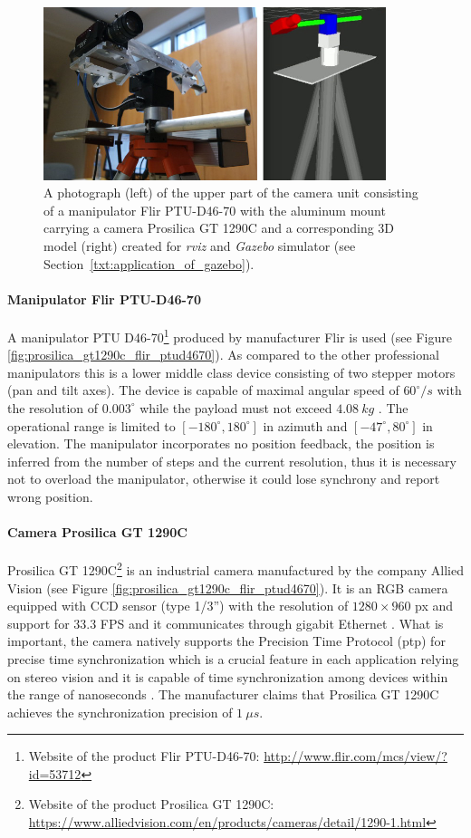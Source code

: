 \begin{figure}[tbh]
	\centering
	\includegraphics[width=10cm]{fig/camera_unit_photo_model.jpg}
	\caption{A photograph (left) of the upper part of the camera unit consisting of a manipulator Flir PTU-D46-70 with the aluminum mount carrying a camera Prosilica GT 1290C and a corresponding 3D model (right) created for \textit{rviz} and \textit{Gazebo} simulator (see Section~\ref{txt:application_of_gazebo}).}
	\label{fig:camera_unit_photo_model}
\end{figure}

\paragraph{Manipulator Flir PTU-D46-70} A manipulator PTU D46-70\footnote{Website of the product Flir PTU-D46-70: \url{http://www.flir.com/mcs/view/?id=53712}} produced by manufacturer Flir is used (see Figure \ref{fig:prosilica_gt1290c_flir_ptud4670}). As compared to the other professional manipulators this is a lower middle class device consisting of two stepper motors (pan and tilt axes). The device is capable of maximal angular speed of $60^{\circ}/s$ with the resolution of $0.003^{\circ}$ while the payload must not exceed $4.08~kg$ \cite{Flir_ptud4670}. The operational range is limited to $[-180^{\circ}, 180^{\circ}]$ in azimuth and $[-47^{\circ}, 80^{\circ}]$ in elevation. The manipulator incorporates no position feedback, the position is inferred from the number of steps and the current resolution, thus it is necessary not to overload the manipulator, otherwise it could lose synchrony and report wrong position.

\paragraph{Camera Prosilica GT 1290C} Prosilica GT 1290C\footnote{Website of the product Prosilica GT 1290C: \url{https://www.alliedvision.com/en/products/cameras/detail/1290-1.html}} is an industrial camera manufactured by the company Allied Vision (see Figure \ref{fig:prosilica_gt1290c_flir_ptud4670}). It is an RGB camera equipped with CCD sensor (type 1/3'') with the resolution of $1280 \times 960$ px and support for $33.3$ FPS and it communicates through gigabit Ethernet \cite{Prosilica_gt1290c}. What is important, the camera natively supports the Precision Time Protocol (\gls{ptp}) for precise time synchronization which is a crucial feature in each application relying on stereo vision and it is capable of time synchronization among devices within the range of nanoseconds \cite{PTP}. The manufacturer claims that Prosilica GT 1290C achieves the synchronization precision of $1~\mu s$.

